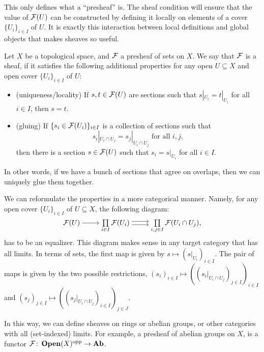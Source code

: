 \documentclass{article}
\DeclareMathOperator{\Open}{\mathbf{Open}}
\DeclareMathOperator{\opp}{opp}
\begin{document}
This only defines what a ``presheaf'' is.
The sheaf condition will ensure that the value of $\mathcal{F}(U)$ can be
constructed by defining it locally on elements of a cover $\{U_i\}_{i\in I}$ of $U$.
It is exactly this interaction between local definitions and global objects
that makes sheaves so useful.
\begin{definition}[Sheaves]
    Let $X$ be a topological space, and $\mathcal{F}$ a presheaf of sets on $X$.
    We say that $\mathcal{F}$ is a sheaf, if it satisfies the following additional properties
    for any open $U\subseteq X$ and open cover $\{U_i\}_{i\in I}$ of $U$:
    \begin{itemize}
        \item (uniqueness/locality) If $s,t\in \mathcal{F}(U)$ are sections such that
              $s|_{U_i} = t|_{U_i}$ for all $i\in I$, then $s=t$.
        \item (gluing) If $\{s_i \in \mathcal{F}(U_i)\}_{i\in I}$ is
              a collection of sections such that
              \begin{equation*}
                  s_i|_{U_i \cap U_j} = s_j|_{U_i \cap U_j} \text { for all } i, j,
              \end{equation*}
              then there is a section $s\in \mathcal{F}(U)$ such that $s_i = s|_{U_i}$ for all $i \in I$.
    \end{itemize}
    In other words, if we have a bunch of sections
    that agree on overlaps, then we can uniquely glue them together.
\end{definition}
\begin{remark}
    \label{rem:cat_def_sheaf}
    We can reformulate the properties in a more categorical manner.
    Namely, for any open cover $\{U_i\}_{i\in I}$ of $U\subseteq X$,
    the following diagram:
    \begin{equation*}
        \begin{tikzcd}[cramped]
            \mcF(U) \rar
            &\prod\limits_{i\in I} \mcF(U_i) \rar[shift left] \rar[shift right]
            & \prod\limits_{i,j \in I} \mcF(U_i\cap U_j),
        \end{tikzcd}
    \end{equation*}
    has to be an equalizer. This diagram makes sense in any target category
    that has all limits. In terms of sets,
    the first map is given by $s \mapsto (s|_{U_i})_{i\in I}$. The pair of
    maps is given by the two possible restrictions, $(s_i)_{i\in I} \mapsto ((s_i|_{U_i \cap U_j})_{j\in I})_{i\in I}$
    and $(s_j)_{j\in I} \mapsto ((s_j|_{U_i \cap U_j})_{i\in I})_{j\in J}$.

    In this way, we can define sheaves on rings or abelian groups, or other
    categories with all (set-indexed) limits.
    For example, a presheaf of abelian groups on $X$, is a functor
    $\mcF \colon \Open(X)^{\opp} \to \Ab$.
\end{remark}
\end{document}
